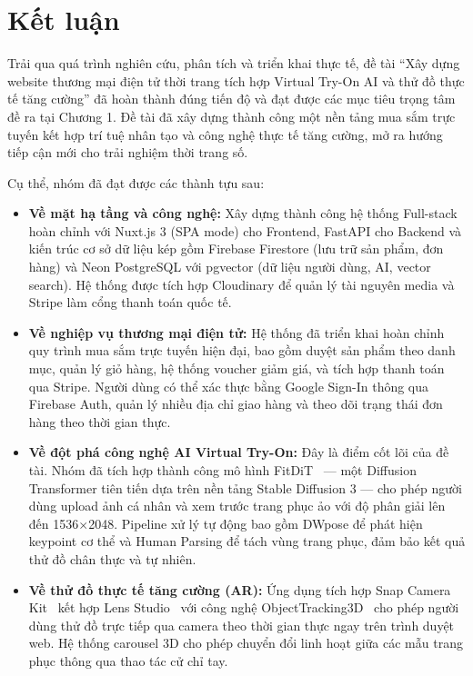 \section{Kết luận}
Trải qua quá trình nghiên cứu, phân tích và triển khai thực tế, đề tài ``Xây dựng website thương mại điện tử thời trang tích hợp Virtual Try-On AI và thử đồ thực tế tăng cường'' đã hoàn thành đúng tiến độ và đạt được các mục tiêu trọng tâm đề ra tại Chương 1. Đề tài đã xây dựng thành công một nền tảng mua sắm trực tuyến kết hợp trí tuệ nhân tạo và công nghệ thực tế tăng cường, mở ra hướng tiếp cận mới cho trải nghiệm thời trang số.

Cụ thể, nhóm đã đạt được các thành tựu sau:
\begin{itemize}[noitemsep]
    \item \textbf{Về mặt hạ tầng và công nghệ:} Xây dựng thành công hệ thống Full-stack hoàn chỉnh với Nuxt.js 3 (SPA mode) cho Frontend, FastAPI cho Backend và kiến trúc cơ sở dữ liệu kép gồm Firebase Firestore (lưu trữ sản phẩm, đơn hàng) và Neon PostgreSQL với pgvector (dữ liệu người dùng, AI, vector search). Hệ thống được tích hợp Cloudinary để quản lý tài nguyên media và Stripe làm cổng thanh toán quốc tế.

    \item \textbf{Về nghiệp vụ thương mại điện tử:} Hệ thống đã triển khai hoàn chỉnh quy trình mua sắm trực tuyến hiện đại, bao gồm duyệt sản phẩm theo danh mục, quản lý giỏ hàng, hệ thống voucher giảm giá, và tích hợp thanh toán qua Stripe. Người dùng có thể xác thực bằng Google Sign-In thông qua Firebase Auth, quản lý nhiều địa chỉ giao hàng và theo dõi trạng thái đơn hàng theo thời gian thực.

    \item \textbf{Về đột phá công nghệ AI Virtual Try-On:} Đây là điểm cốt lõi của đề tài. Nhóm đã tích hợp thành công mô hình FitDiT~\cite{fitdit_paper} --- một Diffusion Transformer tiên tiến dựa trên nền tảng Stable Diffusion 3 --- cho phép người dùng upload ảnh cá nhân và xem trước trang phục ảo với độ phân giải lên đến 1536$\times$2048. Pipeline xử lý tự động bao gồm DWpose để phát hiện keypoint cơ thể và Human Parsing để tách vùng trang phục, đảm bảo kết quả thử đồ chân thực và tự nhiên.

    \item \textbf{Về thử đồ thực tế tăng cường (AR):} Ứng dụng tích hợp Snap Camera Kit~\cite{snap_camera_kit_docs} kết hợp Lens Studio~\cite{lens_studio_docs} với công nghệ ObjectTracking3D~\cite{snap_body_tracking_docs} cho phép người dùng thử đồ trực tiếp qua camera theo thời gian thực ngay trên trình duyệt web. Hệ thống carousel 3D cho phép chuyển đổi linh hoạt giữa các mẫu trang phục thông qua thao tác cử chỉ tay.


\end{itemize}
